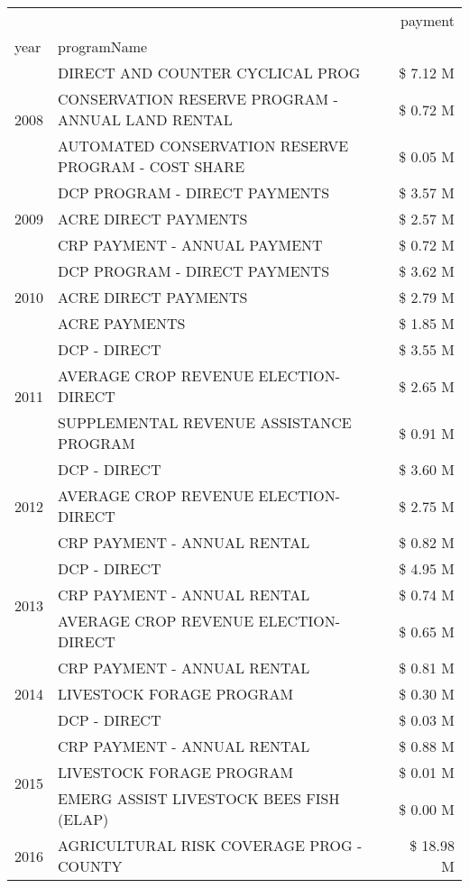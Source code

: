 \begin{tabular}{llr}
\toprule
 &  & payment \\
year & programName &  \\
\midrule
\multirow[t]{3}{*}{2008} & DIRECT AND COUNTER CYCLICAL PROG & \$ 7.12 M \\
 & CONSERVATION RESERVE PROGRAM - ANNUAL LAND RENTAL & \$ 0.72 M \\
 & AUTOMATED CONSERVATION RESERVE PROGRAM - COST SHARE & \$ 0.05 M \\
\cline{1-3}
\multirow[t]{3}{*}{2009} & DCP PROGRAM - DIRECT PAYMENTS & \$ 3.57 M \\
 & ACRE DIRECT PAYMENTS & \$ 2.57 M \\
 & CRP PAYMENT - ANNUAL PAYMENT & \$ 0.72 M \\
\cline{1-3}
\multirow[t]{3}{*}{2010} & DCP PROGRAM - DIRECT PAYMENTS & \$ 3.62 M \\
 & ACRE DIRECT PAYMENTS & \$ 2.79 M \\
 & ACRE PAYMENTS & \$ 1.85 M \\
\cline{1-3}
\multirow[t]{3}{*}{2011} & DCP - DIRECT & \$ 3.55 M \\
 & AVERAGE CROP REVENUE ELECTION-DIRECT & \$ 2.65 M \\
 & SUPPLEMENTAL REVENUE ASSISTANCE PROGRAM & \$ 0.91 M \\
\cline{1-3}
\multirow[t]{3}{*}{2012} & DCP - DIRECT & \$ 3.60 M \\
 & AVERAGE CROP REVENUE ELECTION-DIRECT & \$ 2.75 M \\
 & CRP PAYMENT - ANNUAL RENTAL & \$ 0.82 M \\
\cline{1-3}
\multirow[t]{3}{*}{2013} & DCP - DIRECT & \$ 4.95 M \\
 & CRP PAYMENT - ANNUAL RENTAL & \$ 0.74 M \\
 & AVERAGE CROP REVENUE ELECTION-DIRECT & \$ 0.65 M \\
\cline{1-3}
\multirow[t]{3}{*}{2014} & CRP PAYMENT - ANNUAL RENTAL & \$ 0.81 M \\
 & LIVESTOCK FORAGE PROGRAM & \$ 0.30 M \\
 & DCP - DIRECT & \$ 0.03 M \\
\cline{1-3}
\multirow[t]{3}{*}{2015} & CRP PAYMENT - ANNUAL RENTAL & \$ 0.88 M \\
 & LIVESTOCK FORAGE PROGRAM & \$ 0.01 M \\
 & EMERG ASSIST LIVESTOCK BEES FISH (ELAP) & \$ 0.00 M \\
\cline{1-3}
\multirow[t]{3}{*}{2016} & AGRICULTURAL RISK COVERAGE PROG - COUNTY      & \$ 18.98 M \\

\end{tabular}
